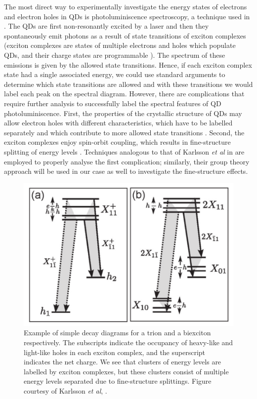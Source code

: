 \documentclass[12pt]{article}
\begin{document}
The most direct way to experimentally investigate the energy states of electrons and electron holes in QDs is photoluminiscence spectroscopy, a technique used in \cite{karlsson}. The QDs are first non-resonantly excited by a laser and then they spontaneously emit photons as a result of state transitions of exciton complexes (exciton complexes are states of multiple electrons and holes which populate QDs, and their charge states are programmable \cite{charge_state}). The spectrum of these emissions is given by the allowed state transitions. Hence, if each exciton complex state had a single associated energy, we could use standard arguments to determine which state transitions are allowed and with these transitions we would label each peak on the spectral diagram. However, there are complications that require further analysis to successfully label the spectral features of QD photoluminiscence. First, the properties of the crystallic structure of QDs may allow electron holes with different characteristics, which have to be labelled separately and which contribute to more allowed state transitions \cite{karlsson2}. Second, the exciton complexes enjoy spin-orbit coupling, which results in fine-structure splitting of energy levels \cite{fine-structure}. Techniques analogous to that of Karlsson \textit{et al} in \cite{karlsson} are employed to properly analyse the first complication; similarly, their group theory approach will be used in our case as well to investigate the fine-structure effects.

\begin{figure}
\begin{center}
\includegraphics[scale=0.3]{figures/example_decay_diagrams}
\end{center}
\caption{Example of simple decay diagrams for a trion and a biexciton respectively. The subscripts indicate the occupancy of heavy-like and light-like holes in each exciton complex, and the superscript indicates the net charge. We see that clusters of energy levels are labelled by exciton complexes, but these clusters consist of multiple energy levels separated due to fine-structure splittings. Figure courtesy of Karlsson \textit{et al}, \cite{karlsson}.}
\end{figure}
	
\end{document}
